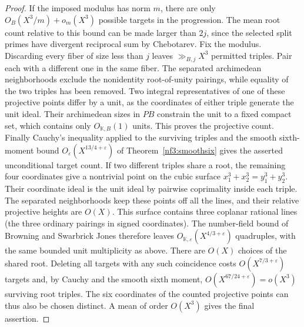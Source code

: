 \documentclass[11pt,letterpaper]{article}
\theoremstyle{definition}
\numberwithin{equation}{section}
\begin{document}
\begin{proof}
If the imposed modulus has norm $m$, there are only
$O_B(X^3/m)+o_m(X^3)$ possible targets in the progression.
The mean root count relative to this bound can be made larger
than $2j$, since the selected split primes have divergent reciprocal
sum by Chebotarev. Fix the modulus. Discarding every fiber
of size less than $j$ leaves $\gg_{B,j}X^3$ permitted triples.
Pair each with a different one in the same fiber. The separated
archimedean neighborhoods exclude the nonidentity root-of-unity
pairings, while equality of the two triples has been removed.
Two integral representatives of one of these projective points
differ by a unit, as the coordinates of either triple generate
the unit ideal. Their archimedean sizes in $PB$ constrain the unit
to a fixed compact set, which contains only $O_{\mathbb K,B}(1)$
units. This proves the projective count.
Finally Cauchy's inequality applied to the surviving triples and
the smooth sixth-moment bound $O_{\varepsilon}(X^{13/4+\varepsilon})$
of Theorem~\ref{nf3:smoothsix}
gives the asserted unconditional target count. If two different
triples share a root, the remaining four coordinates give a
nontrivial point on the cubic surface $x_1^3+x_2^3=y_1^3+y_2^3$.
Their coordinate ideal is the unit ideal by pairwise coprimality
inside each triple. The separated neighborhoods keep these points
off all the lines, and their relative projective heights are $O(X)$.
This surface contains three coplanar rational lines (the three
ordinary pairings in signed coordinates). The number-field bound
of Browning and Swarbrick Jones \cite[Theorem 1.2]{nf3:bsj}
therefore leaves $O_{\mathbb K,\varepsilon}(X^{4/3+\varepsilon})$
quadruples, with the same bounded unit multiplicity as above.
There are $O(X)$ choices of the shared root. Deleting all targets
with any such coincidence costs $O(X^{7/3+\varepsilon})$ targets
and, by Cauchy and the smooth sixth moment,
$O(X^{67/24+\varepsilon})=o(X^3)$ surviving root triples. The six
coordinates of the counted projective points can thus also be chosen
distinct. A mean of order
$O(X^3)$ gives the final assertion.
\end{proof}
\end{document}
